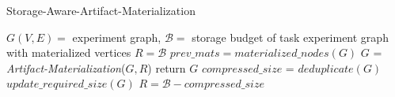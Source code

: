 \begin{algorithm}[h]
\caption{Storage-Aware-Artifact-Materialization}\label{algorithm-compression-aware-materialization}
\begin{algorithmic}[1]
\Require  $G(V,E)=$ experiment graph, $\mathcal{B}=$ storage budget of task
\Ensure experiment graph with materialized vertices
\State $R = \mathcal{B}$ 
	\State $prev\_mats = materialized\_nodes(G)$
	\State $G$  = \textit{Artifact-Materialization}($G, R$)
		\State return $G$
	\EndIf
	\State $compressed\_size$ = $deduplicate(G)$
	\State $update\_required\_size(G)$
	\State  $R = \mathcal{B} -  compressed\_size$
\EndWhile
\end{algorithmic}
\end{algorithm}

